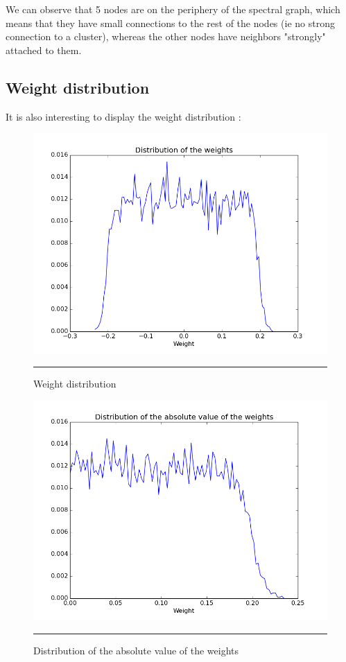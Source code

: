 We can observe that 5 nodes are on the periphery of the spectral graph, which means that they have small connections to the rest of the nodes (ie no strong connection to a cluster), whereas the other nodes have neighbors "strongly" attached to them. 

\subsection{Weight distribution}
It is also interesting to display the weight distribution : 

\begin{figure}[htbp]
    \centering
    \includegraphics[scale=0.4]{Figures/weight_distribution.png}
    \rule{35em}{0.5pt}
    \caption[Weight distribution ]{Weight distribution}
    \label{fig:weight_dist}
\end{figure}

\begin{figure}[htbp]
    \centering
    \includegraphics[scale=0.4]{Figures/abs_weight_distribution.png}
    \rule{35em}{0.5pt}
    \caption[Distribution of the absolute value of the weights]{Distribution of the absolute value of the weights}
    \label{fig:abs_weight_dist}
\end{figure}

